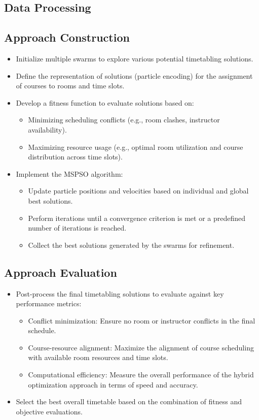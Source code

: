 \documentclass{article}
\begin{document}
\subsection{Data Processing}
\label{subsec}


\subsection{Approach Construction}
\label{subsec
} \begin{itemize} \item Initialize multiple swarms to explore various potential timetabling solutions. \item Define the representation of solutions (particle encoding) for the assignment of courses to rooms and time slots. \item Develop a fitness function to evaluate solutions based on: \begin{itemize} \item Minimizing scheduling conflicts (e.g., room clashes, instructor availability). \item Maximizing resource usage (e.g., optimal room utilization and course distribution across time slots). \end{itemize} \item Implement the MSPSO algorithm: \begin{itemize} \item Update particle positions and velocities based on individual and global best solutions. \item Perform iterations until a convergence criterion is met or a predefined number of iterations is reached. \item Collect the best solutions generated by the swarms for refinement. \end{itemize} \end{itemize}

\subsection{Approach Evaluation}
\label{subsec
} \begin{itemize} \item Post-process the final timetabling solutions to evaluate against key performance metrics: \begin{itemize} \item Conflict minimization: Ensure no room or instructor conflicts in the final schedule. \item Course-resource alignment: Maximize the alignment of course scheduling with available room resources and time slots. \item Computational efficiency: Measure the overall performance of the hybrid optimization approach in terms of speed and accuracy. \end{itemize} \item Select the best overall timetable based on the combination of fitness and objective evaluations. 
\end{itemize}
\end{document}
